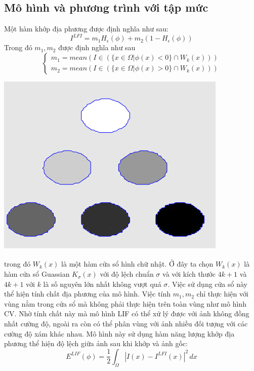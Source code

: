 \documentclass[14pt,oneside,a4paper]{extreport}
\begin{document}
\subsection{Mô hình và phương trình với tập mức}
Một hàm khớp địa phương được định nghĩa như sau:
\begin{equation*}
I^{LFI}= m_1H_{\epsilon}(\phi)+m_2(1-H_{\epsilon}(\phi))
\end{equation*}
Trong đó $m_1,m_2$ được định nghĩa như sau
\begin{equation*}
\begin{cases}
 m_1=mean(I\in (\{x\in \Omega|\phi(x)<0\}\cap W_k(x)))\\
  m_2=mean(I\in (\{x\in \Omega|\phi(x)>0\}\cap W_k(x)))
   \end{cases}
\end{equation*}
\begin{center}
\includegraphics[scale=.7]{figure/3clif1.png}
\end{center}
trong đó $W_k(x)$ là một hàm cửa sổ hình chữ nhật. Ở đây ta chọn $W_k(x)$  là hàm cửa sổ Guassian $K_{\sigma}(x)$ với độ lệch chuẩn $\sigma$ và với kích thước $4k+1$ và $4k+1$ với $k$ là số nguyên lớn nhất không vượt quá $\sigma$. Việc sử dụng cửa sổ này thể hiện tính chất địa phương của mô hình. Việc tính $m_1, m_2$ chỉ thực hiện với vùng nằm trong cửa sổ mà không phải thực hiện trên toàn vùng như mô hình CV. Nhờ tính chất này mà mô hình LIF có thể xử lý được với ảnh không đồng nhất cường độ, ngoài ra còn có thể phân vùng với ảnh nhiều đối tượng với các cường độ xám khác nhau. Mô hình này sử dụng hàm năng lượng khớp địa phương thể hiện độ lệch giữa ảnh sau khi khớp và ảnh gốc:
\begin{equation*}
E^{LIF}(\phi)=\dfrac{1}{2}\int_{\Omega}|I(x)-I^{LFI}(x)|^2\,dx
\end{equation*}
\end{document}
